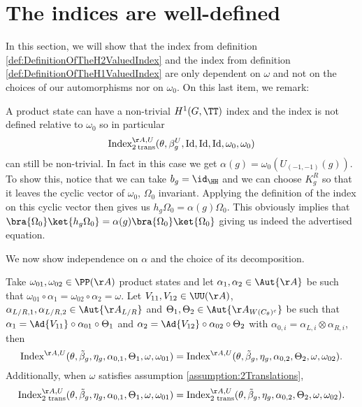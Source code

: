 \section{The indices are well-defined}\label{sec:IndexIsInvariantUnderChoices}
In this section, we will show that the index from definition \ref{def:DefinitionOfTheH2ValuedIndex} and the index from definition \ref{def:DefinitionOfTheH1ValuedIndex} are only dependent on $\omega$ and not on the choices of our automorphisms nor on $\omega_0$. On this last item, we remark:
\begin{remark}\label{rem:NontrivialProductState}
	A product state can have a non-trivial $H^1(G,\TT)$ index and the index is not defined relative to $\omega_0$ so in particular
	\begin{equation}
		\textrm{Index}_{2\:\text{trans}}^{\AA,U}(\theta,\beta_g^U,\textrm{Id},\textrm{Id},\textrm{Id},\omega_0,\omega_0)
	\end{equation}
	can still be non-trivial. In fact in this case we get $\alpha(g)=\omega_0(U_{(-1,-1)}(g))$. To show this, notice that we can take $b_g=\id_{\HH}$ and we can choose $K_g^R$ so that it leaves the cyclic vector of $\omega_0$, $\Omega_0$ invariant. Applying the definition of the index on this cyclic vector then gives us $h_g\Omega_0=\alpha(g)\Omega_0$. This obviously implies that $\bra{\Omega_0}\ket{h_g\Omega_0}=\alpha(g)\bra{\Omega_0}\ket{\Omega_0}$ giving us indeed the advertised equation.
\end{remark}
We now show independence on $\alpha$ and the choice of its decomposition.
\begin{lemma}
	Take $\omega_{01},\omega_{02}\in\PP(\AA)$ product states and let $\alpha_1,\alpha_2\in\Aut{\AA}$ be such that $\omega_{01}\circ\alpha_1=\omega_{02}\circ\alpha_2=\omega$. Let $V_{11},V_{12}\in\UU(\AA)$, $\alpha_{L/R,1},\alpha_{L/R,2}\in\Aut{\AA_{L/R}}$ and $\Theta_1,\Theta_2\in \Aut{\AA_{W(C_\theta)^c}}$ be such that $\alpha_1=\Ad{V_{11}}\circ\alpha_{01}\circ\Theta_1$ and $\alpha_2=\Ad{V_{12}}\circ\alpha_{02}\circ \Theta_2$ with $\alpha_{0,i}=\alpha_{L,i}\otimes\alpha_{R,i}$, then
	\begin{equation}
		\textrm{Index}^{\AA,U}(\theta,\tilde{\beta}_g,\eta_g,\alpha_{0,1},\Theta_1,\omega,\omega_{01})=\textrm{Index}^{\AA,U}(\theta,\tilde{\beta}_g,\eta_g,\alpha_{0,2},\Theta_2,\omega,\omega_{02}).
	\end{equation}
	Additionally, when $\omega$ satisfies assumption \ref{assumption:2Translations},
	\begin{equation}
		\textrm{Index}^{\AA,U}_{\text{2 trans}}(\theta,\tilde{\beta}_g,\eta_g,\alpha_{0,1},\Theta_1,\omega,\omega_{01})=\textrm{Index}^{\AA,U}_{\text{2 trans}}(\theta,\tilde{\beta}_g,\eta_g,\alpha_{0,2},\Theta_2,\omega,\omega_{02}).
	\end{equation}
\end{lemma}
